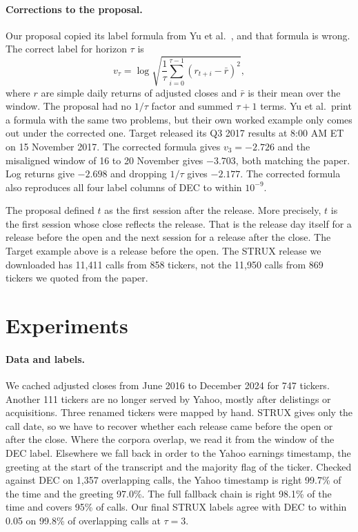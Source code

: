\documentclass{article}
\begin{document}
\paragraph{Corrections to the proposal.}
Our proposal copied its label formula from Yu et al.\ \cite{yu-etal-2025-company}, and that formula is wrong. The correct label for horizon $\tau$ is
\[
v_\tau = \log \sqrt{\frac{1}{\tau}\sum_{i=0}^{\tau-1}\left(r_{t+i}-\bar r\right)^2},
\]
where $r$ are simple daily returns of adjusted closes and $\bar r$ is their mean over the window. The proposal had no $1/\tau$ factor and summed $\tau+1$ terms. Yu et al.\ print a formula with the same two problems, but their own worked example only comes out under the corrected one. Target released its Q3 2017 results at 8:00 AM ET on 15 November 2017. The corrected formula gives $v_3=-2.726$ and the misaligned window of 16 to 20 November gives $-3.703$, both matching the paper. Log returns give $-2.698$ and dropping $1/\tau$ gives $-2.177$. The corrected formula also reproduces all four label columns of DEC to within $10^{-9}$.

The proposal defined $t$ as the first session after the release. More precisely, $t$ is the first session whose close reflects the release. That is the release day itself for a release before the open and the next session for a release after the close. The Target example above is a release before the open. The STRUX release we downloaded has 11,411 calls from 858 tickers, not the 11,950 calls from 869 tickers we quoted from the paper.

\section{Experiments}

\paragraph{Data and labels.}
We cached adjusted closes from June 2016 to December 2024 for 747 tickers. Another 111 tickers are no longer served by Yahoo, mostly after delistings or acquisitions. Three renamed tickers were mapped by hand. STRUX gives only the call date, so we have to recover whether each release came before the open or after the close. Where the corpora overlap, we read it from the window of the DEC label. Elsewhere we fall back in order to the Yahoo earnings timestamp, the greeting at the start of the transcript and the majority flag of the ticker. Checked against DEC on 1,357 overlapping calls, the Yahoo timestamp is right 99.7\% of the time and the greeting 97.0\%. The full fallback chain is right 98.1\% of the time and covers 95\% of calls. Our final STRUX labels agree with DEC to within 0.05 on 99.8\% of overlapping calls at $\tau=3$.
\end{document}
